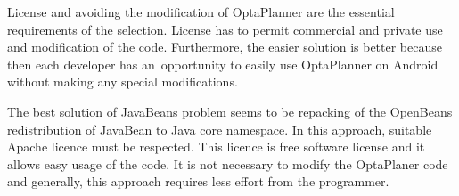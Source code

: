 License and avoiding the modification of OptaPlanner are the essential requirements of the selection. License has to
permit commercial and private use and modification of the code. Furthermore, the easier solution is better because then
each developer has an~opportunity to easily use OptaPlanner on Android without making any special modifications.

The best solution of JavaBeans problem seems to be repacking of the OpenBeans redistribution of JavaBean to Java core
namespace. In this approach, suitable Apache licence must be respected. This licence is free software license and it
allows easy usage of the code. It is not necessary to modify the OptaPlaner code and generally, this approach requires
less effort from the programmer.

\begin{table}[h!]
\end{table}
